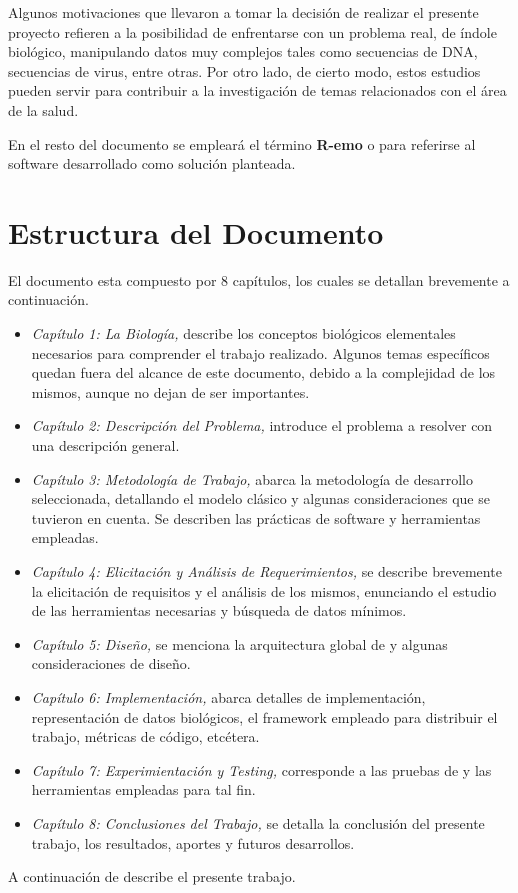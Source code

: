 \par Algunos motivaciones que llevaron a tomar la decisión de realizar el presente proyecto refieren a la posibilidad de enfrentarse con un problema real, de índole biológico, manipulando datos muy complejos tales como secuencias de DNA, secuencias de virus, entre otras. Por otro lado, de cierto modo, 
estos estudios pueden servir para contribuir a la investigación de temas relacionados con el área de la salud.

\par En el resto del documento se empleará el término \textbf{R-emo} o \remo para referirse al software desarrollado como solución planteada.

\section*{Estructura del Documento}
El documento esta compuesto por 8 capítulos, los cuales se detallan brevemente a continuación. 
\begin{itemize}
    \item \emph{Capítulo 1: La Biología,} describe los conceptos biológicos elementales necesarios para comprender el trabajo realizado. Algunos temas específicos quedan fuera del alcance de este documento, debido a la complejidad de los mismos, aunque no dejan de ser importantes.
    \item \emph{Capítulo 2: Descripción del Problema,} introduce el problema a resolver con una descripción general. 
    \item \emph{Capítulo 3: Metodología de Trabajo,} abarca la metodología de desarrollo seleccionada, detallando el modelo clásico y algunas consideraciones que se tuvieron en cuenta. Se describen las prácticas de software y herramientas empleadas.    
    \item \emph{Capítulo 4: Elicitación y Análisis de Requerimientos,} se describe brevemente la elicitación de requisitos y el análisis de los mismos, enunciando el estudio de las herramientas necesarias y búsqueda de datos mínimos.
    \item \emph{Capítulo 5: Diseño,} se menciona la arquitectura global de \remo y algunas consideraciones de diseño. 
    \item \emph{Capítulo 6: Implementación,} abarca detalles de implementación, representación de datos biológicos, el framework empleado para distribuir el trabajo, métricas de código, etcétera.
    \item \emph{Capítulo 7: Experimientación y Testing,} corresponde a las pruebas de \remo y las herramientas empleadas para tal fin.
    \item \emph{Capítulo 8: Conclusiones del Trabajo,} se detalla la conclusión del presente trabajo, los resultados, aportes y futuros desarrollos.    
\end{itemize}
A continuación de describe el presente trabajo.